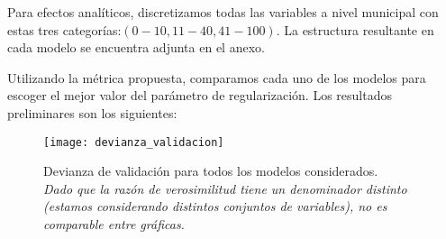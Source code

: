 Para efectos analíticos, discretizamos todas las variables a nivel municipal con estas tres categorías:$(0-10, 11-40, 41-100)$. La estructura resultante en cada modelo se encuentra adjunta en el anexo.
\par
\noindent
Utilizando la métrica propuesta, comparamos cada uno de los modelos para escoger el mejor valor del parámetro de regularización. Los resultados preliminares son los siguientes:
\begin{figure}[h]
    \caption{Devianza de validación para todos los modelos considerados.\\
    \textit{Dado que la razón de verosimilitud tiene un denominador distinto (estamos considerando distintos conjuntos de variables), no es comparable entre gráficas.}}
    \texttt{[image: devianza\_validacion]}
\end{figure}
